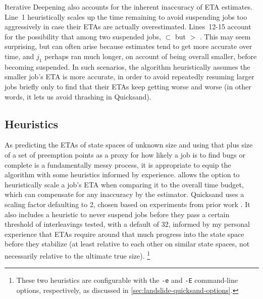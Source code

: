 Iterative Deepening also accounts for the inherent inaccuracy of ETA estimates.
Line~1 heuristically scales up the time remaining to avoid suspending jobs too aggressively
in case their ETAs are actually overestimated.
Lines~12-15 account for the
possibility that among two suspended jobs,
 $\subset$ 
but
 $>$ .
This may seem surprising,
but can often arise because estimates tend to get more accurate over time,
and $j_1$ perhaps ran much longer, on account of being overall smaller,
before becoming suspended.
In such scenarios,
the algorithm heuristically assumes the smaller job's ETA is more accurate,
in order to avoid repeatedly resuming larger jobs briefly only to find that their ETAs keep getting worse and worse
(in other words, it lets us avoid thrashing in Quicksand). %


\subsection{Heuristics}

As predicting the ETAs of state spaces of unknown size
and using that plus size of a set of preemption points as a proxy for how likely a job is to find bugs or complete
is a fundamentally messy process,
it is appropriate to equip the algorithm with some heuristics informed by experience.
 allows the option to heuristically scale a job's ETA
when comparing it to the overall time budget,
which can compensate for any inaccuracy by the estimator.
Quicksand uses a scaling factor defaulting to 2,
chosen based on experiments from prior work \cite{estimation}.
It also includes a heuristic to
never suspend jobs before they pass a certain threshold of interleavings tested,
with a default of 32,
informed by my personal experience that ETAs require around that much progress into the state space
before they stabilize (at least relative to each other on similar state spaces,
not necessarily relative to the ultimate true size).%
\footnote{These two heuristics are configurable with the
{\tt -e} and {\tt -E} command-line options, respectively,
as discussed in \cref{sec:landslide-quicksand-options}.}

